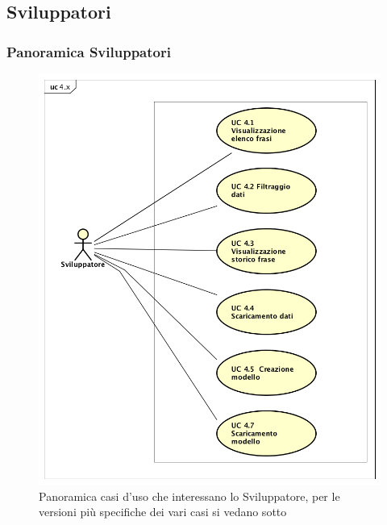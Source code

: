 \subsection{Sviluppatori}
\subsubsection{Panoramica Sviluppatori}
\begin{figure}[H]
\centering
\includegraphics[width=17cm]{img/UC4x.png} 
\caption{Panoramica casi d'uso che interessano lo Sviluppatore, per le versioni più specifiche dei vari casi si vedano sotto}\label{fig:4x}
\end{figure}
